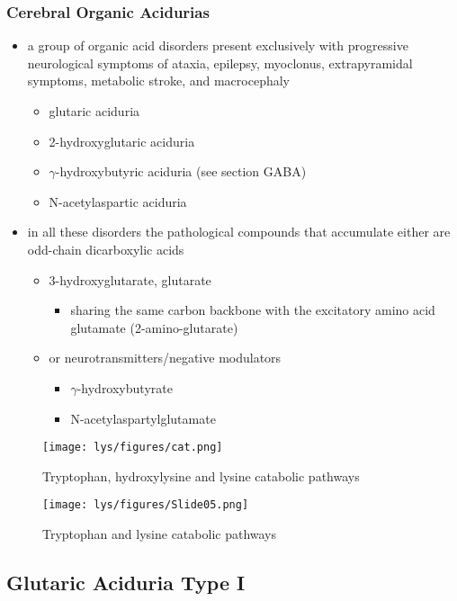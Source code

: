\documentclass{scrartcl}
\begin{document}
\subsubsection{Cerebral Organic Acidurias}
\label{sec:orgcbde3d0}
\begin{itemize}
\item a group of organic acid disorders present exclusively with
progressive neurological symptoms of ataxia, epilepsy, myoclonus,
extrapyramidal symptoms, metabolic stroke, and macrocephaly
\begin{itemize}
\item glutaric aciduria
\item 2-hydroxyglutaric aciduria
\item \(\gamma\)-hydroxybutyric aciduria (see section GABA)
\item N-acetylaspartic aciduria
\end{itemize}
\item in all these disorders the pathological compounds that accumulate
either are odd-chain dicarboxylic acids
\begin{itemize}
\item 3-hydroxyglutarate, glutarate
\begin{itemize}
\item sharing the same carbon backbone with the excitatory amino acid
glutamate (2-amino-glutarate)
\end{itemize}
\item or neurotransmitters/negative modulators
\begin{itemize}
\item \(\gamma\)-hydroxybutyrate
\item N-acetylaspartylglutamate
\end{itemize}
\end{itemize}
\end{itemize}

\begin{figure}[htbp]
\centering
\texttt{[image: lys/figures/cat.png]}
\caption{\label{fig:orgff050cf}Tryptophan, hydroxylysine and lysine catabolic pathways}
\end{figure}


\begin{figure}[htbp]
\centering
\texttt{[image: lys/figures/Slide05.png]}
\caption{\label{fig:org4202ae3}Tryptophan and lysine catabolic pathways}
\end{figure}

\subsection{Glutaric Aciduria Type I}
\label{sec:orgfc2f564}
\end{document}
